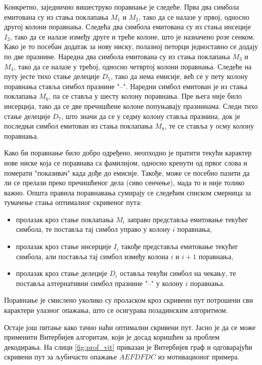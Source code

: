 \documentclass[12pt,oneside]{memoir}
\begin{document}
\begin{CJK}{UTF8}{ipxm}
Конкретно, заједнично вишеструко поравнање је следеће. Прва два симбола емитована су из стања поклапања $M_1$ и $M_2$, тако да се налазе у првој, односно другој колони поравнања. Следећа два симбола емитована су из стања инсеције $I_2$, тако да се налазе између друге и треће колоне, што је назначено розе сенком. Како је то посебан додатак за нову ниску, полазној петорци једноставно се додају по две празнине. Наредна два симбола емитована су из стања поклапања $M_3$ и $M_4$, тако да се налазе у трећој, односно четвртој колони поравнања. Следеће на путу јесте тихо стање делеције $D_5$, тако да нема емисије, већ се у пету колону поравнања ставља симбол празнине "--". Наредни симбол емитован је из стања поклапања $M_6$, па се ставља у шесту колону поравнања. Пре њега није било инсерција, тако да се две пречишћене колоне попуњавају празнинама. Следи тихо стање делеције $D_7$, што значи да се у седму колону ставља празнина, док је последњи симбол емитован из стања поклапања $M_8$, те се ставља у осму колону поравнања.

Како би поравнање било добро одређено, неопходно је пратити текући карактер нове ниске која се поравнава са фамилијом, односно кренути од првог слова и померати "показивач" када дође до емисије. Такође, може се посебно пазити да ли се прелази преко пречишћеног дела (сиво сенчење), мада то и није толико важно. Општа правила поравнавања сумирају се следећим списком смерница за тумачење стања оптималног скривеног пута:
\begin{itemize}
  \item пролазак кроз стање поклапања $M_i$ заправо представља емитовање текућег симбола, те поставља тај симбол управо у колону $i$ поравнања,
  \item пролазак кроз стање инсерције $I_i$ такође представља емитовање текућег симбола, али поставља тај симбол између колона $i$ и $i+1$ поравнања,
  \item пролазак кроз стање делеције $D_i$ оставља текући симбол на чекању, те поставља алтернативни симбол празнине "--" у колону $i$ поравнања.
\end{itemize}
Поравнање је смислено уколико су проласком кроз скривени пут потрошени сви карактери улазног опажања, што се осигурава позадинским алгоритмом.

Остаје још питање како тачно наћи оптимални скривени пут. Јасно је да се може применити Витербијев алгоритам, који је досад коришћен за проблем декодирања. На слици \ref{fig:prof_vit} приказан је Витербијев граф и одговарајући скривени пут за љубичасто опажање $AEFDFDC$ из мотивационог примера.


\end{CJK}
\end{document}
